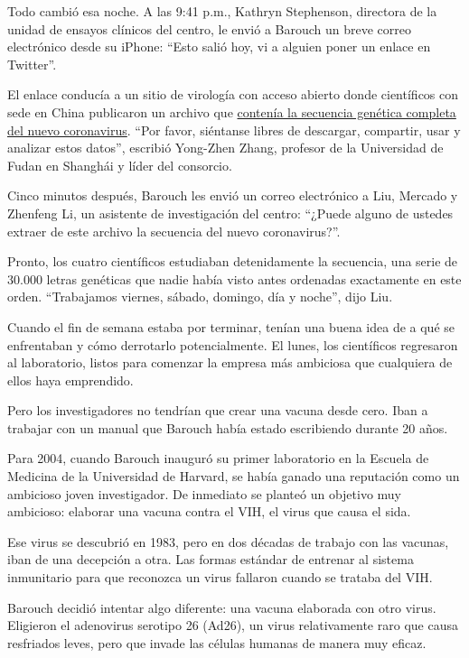 Todo cambió esa noche. A las 9:41 p.m., Kathryn Stephenson, directora de
la unidad de ensayos clínicos del centro, le envió a Barouch un breve
correo electrónico desde su iPhone: ``Esto salió hoy, vi a alguien poner
un enlace en Twitter''.

El enlace conducía a un sitio de virología con acceso abierto donde
científicos con sede en China publicaron un archivo que
\href{https://virological.org/t/novel-2019-coronavirus-genome/319}{contenía
la secuencia genética completa del nuevo coronavirus}. ``Por favor,
siéntanse libres de descargar, compartir, usar y analizar estos datos'',
escribió Yong-Zhen Zhang, profesor de la Universidad de Fudan en
Shanghái y líder del consorcio.

Cinco minutos después, Barouch les envió un correo electrónico a Liu,
Mercado y Zhenfeng Li, un asistente de investigación del centro:
``¿Puede alguno de ustedes extraer de este archivo la secuencia del
nuevo coronavirus?''.

Pronto, los cuatro científicos estudiaban detenidamente la secuencia,
una serie de 30.000 letras genéticas que nadie había visto antes
ordenadas exactamente en este orden. ``Trabajamos viernes, sábado,
domingo, día y noche'', dijo Liu.

Cuando el fin de semana estaba por terminar, tenían una buena idea de a
qué se enfrentaban y cómo derrotarlo potencialmente. El lunes, los
científicos regresaron al laboratorio, listos para comenzar la empresa
más ambiciosa que cualquiera de ellos haya emprendido.

Pero los investigadores no tendrían que crear una vacuna desde cero.
Iban a trabajar con un manual que Barouch había estado escribiendo
durante 20 años.

Para 2004, cuando Barouch inauguró su primer laboratorio en la Escuela
de Medicina de la Universidad de Harvard, se había ganado una reputación
como un ambicioso joven investigador. De inmediato se planteó un
objetivo muy ambicioso: elaborar una vacuna contra el VIH, el virus que
causa el sida.

Ese virus se descubrió en 1983, pero en dos décadas de trabajo con las
vacunas, iban de una decepción a otra. Las formas estándar de entrenar
al sistema inmunitario para que reconozca un virus fallaron cuando se
trataba del VIH.

Barouch decidió intentar algo diferente: una vacuna elaborada con otro
virus. Eligieron el adenovirus serotipo 26 (Ad26), un virus
relativamente raro que causa resfriados leves, pero que invade las
células humanas de manera muy eficaz.

